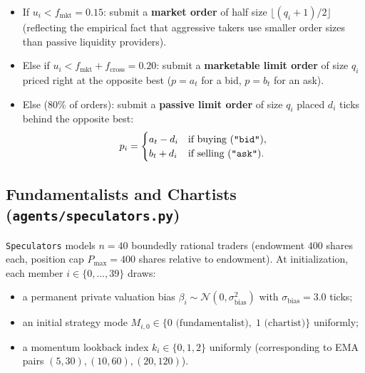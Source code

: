 \documentclass[11pt,a4paper]{article}
\newcommand{\code}[1]{\texttt{#1}}
\begin{document}
\begin{enumerate}[nosep]
\begin{itemize}[nosep]
  \item If $u_i < f_{\text{mkt}} = 0.15$: submit a \textbf{market order} of half size
    $\lfloor (q_i + 1)/2 \rfloor$ (reflecting the empirical fact that aggressive takers use smaller order
    sizes than passive liquidity providers).
  \item Else if $u_i < f_{\text{mkt}} + f_{\text{cross}} = 0.20$: submit a \textbf{marketable limit
    order} of size $q_i$ priced right at the opposite best ($p = a_t$ for a bid, $p = b_t$ for an ask).
  \item Else ($80\%$ of orders): submit a \textbf{passive limit order} of size $q_i$ placed $d_i$ ticks
    behind the opposite best:
    \begin{equation}
      p_i = \begin{cases}
        a_t - d_i & \text{if buying (\code{"bid"})}, \\
        b_t + d_i & \text{if selling (\code{"ask"})}.
      \end{cases}
    \end{equation}
  \end{itemize}
\end{enumerate}

\subsection[Fundamentalists, Chartists, and Brock--Hommes]{Fundamentalists and Chartists (\code{agents/speculators.py})}

\code{Speculators} models $n = 40$ boundedly rational traders (endowment $400$ shares each, position
cap $P_{\max} = 400$ shares relative to endowment). At initialization, each member $i \in \{0,\dots,39\}$
draws:
\begin{itemize}[nosep]
\item a permanent private valuation bias $\beta_i \sim \mathcal{N}(0, \sigma_{\text{bias}}^2)$ with
  $\sigma_{\text{bias}} = 3.0$ ticks;
\item an initial strategy mode $M_{i,0} \in \{0\text{ (fundamentalist)},\; 1\text{ (chartist)}\}$
  uniformly;
\item a momentum lookback index $k_i \in \{0, 1, 2\}$ uniformly (corresponding to EMA pairs
  $(5,30), (10,60), (20,120)$).
\end{itemize}
\end{document}

